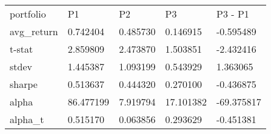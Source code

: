 \begin{tabular}{lllll}
\toprule
\midrule
portfolio & P1 & P2 & P3 & P3 - P1 \\
avg_return & 0.742404 & 0.485730 & 0.146915 & -0.595489 \\
t-stat & 2.859809 & 2.473870 & 1.503851 & -2.432416 \\
stdev & 1.445387 & 1.093199 & 0.543929 & 1.363065 \\
sharpe & 0.513637 & 0.444320 & 0.270100 & -0.436875 \\
alpha & 86.477199 & 7.919794 & 17.101382 & -69.375817 \\
alpha_t & 0.515170 & 0.063856 & 0.293629 & -0.451381 \\
\bottomrule
\end{tabular}

